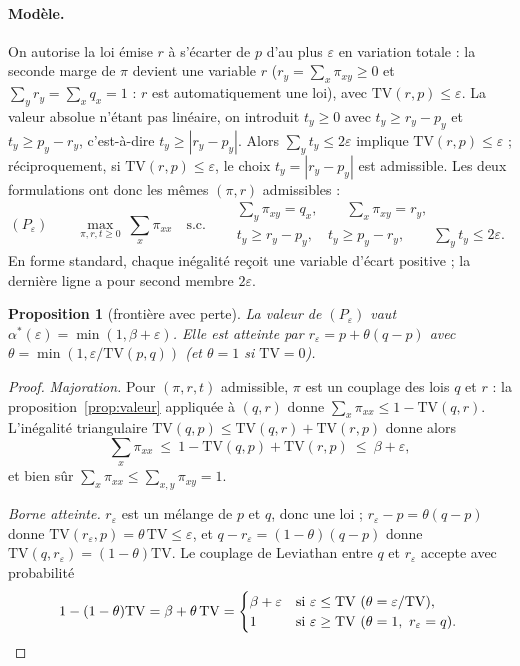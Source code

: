 \documentclass[11pt,a4paper]{article}
\newcommand{\TV}{\mathrm{TV}}
\theoremstyle{plain}
\newtheorem{proposition}{Proposition}
\theoremstyle{definition}
\begin{document}
\paragraph{Modèle.} On autorise la loi émise $r$ à s'écarter de $p$ d'au plus $\varepsilon$ en variation totale : la seconde marge de $\pi$ devient une variable $r$ ($r_y=\sum_x\pi_{xy}\ge0$ et $\sum_yr_y=\sum_xq_x=1$ : $r$ est automatiquement une loi), avec $\TV(r,p)\le\varepsilon$. La valeur absolue n'étant pas linéaire, on introduit $t_y\ge0$ avec $t_y\ge r_y-p_y$ et $t_y\ge p_y-r_y$, c'est-à-dire $t_y\ge|r_y-p_y|$. Alors $\sum_yt_y\le2\varepsilon$ implique $\TV(r,p)\le\varepsilon$ ; réciproquement, si $\TV(r,p)\le\varepsilon$, le choix $t_y=|r_y-p_y|$ est admissible. Les deux formulations ont donc les mêmes $(\pi,r)$ admissibles :
\[(P_\varepsilon)\qquad \max_{\pi,r,t\ge0}\ \sum_x\pi_{xx}\quad\text{s.c.}\quad
\begin{aligned}&\textstyle\sum_y\pi_{xy}=q_x,\qquad \sum_x\pi_{xy}=r_y,\\
&t_y\ge r_y-p_y,\quad t_y\ge p_y-r_y,\qquad \textstyle\sum_yt_y\le2\varepsilon.\end{aligned}\]
En forme standard, chaque inégalité reçoit une variable d'écart positive ; la dernière ligne a pour second membre $2\varepsilon$.

\begin{proposition}[frontière avec perte]\label{prop:perte}
La valeur de $(P_\varepsilon)$ vaut $\alpha^*(\varepsilon)=\min(1,\beta+\varepsilon)$. Elle est atteinte par $r_\varepsilon=p+\theta(q-p)$ avec $\theta=\min(1,\varepsilon/\TV(p,q))$ (et $\theta=1$ si $\TV=0$).
\end{proposition}

\begin{proof}
\emph{Majoration.} Pour $(\pi,r,t)$ admissible, $\pi$ est un couplage des lois $q$ et $r$ : la proposition~\ref{prop:valeur} appliquée à $(q,r)$ donne $\sum_x\pi_{xx}\le1-\TV(q,r)$. L'inégalité triangulaire $\TV(q,p)\le\TV(q,r)+\TV(r,p)$ donne alors
\[\sum_x\pi_{xx}\ \le\ 1-\TV(q,p)+\TV(r,p)\ \le\ \beta+\varepsilon,\]
et bien sûr $\sum_x\pi_{xx}\le\sum_{x,y}\pi_{xy}=1$.

\emph{Borne atteinte.} $r_\varepsilon$ est un mélange de $p$ et $q$, donc une loi ; $r_\varepsilon-p=\theta(q-p)$ donne $\TV(r_\varepsilon,p)=\theta\,\TV\le\varepsilon$, et $q-r_\varepsilon=(1-\theta)(q-p)$ donne $\TV(q,r_\varepsilon)=(1-\theta)\TV$. Le couplage de Leviathan entre $q$ et $r_\varepsilon$ accepte avec probabilité
\[1-(1-\theta)\TV=\beta+\theta\,\TV=\begin{cases}\beta+\varepsilon&\text{si }\varepsilon\le\TV\ (\theta=\varepsilon/\TV),\\1&\text{si }\varepsilon\ge\TV\ (\theta=1,\ r_\varepsilon=q).\end{cases}\qedhere\]
\end{proof}
\end{document}
